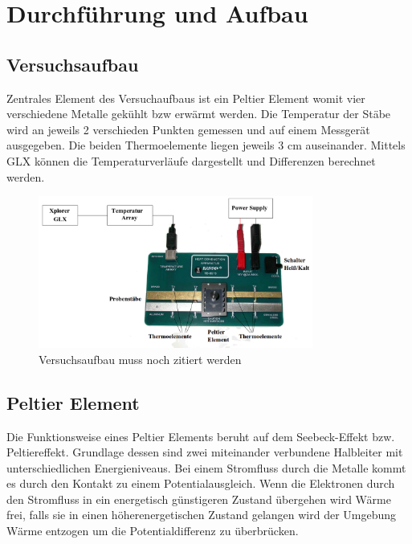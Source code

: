 \section{Durchführung und Aufbau}
\label{sec:Durchführung}
\subsection{Versuchsaufbau}
Zentrales Element des Versuchaufbaus ist ein Peltier Element womit vier verschiedene Metalle gekühlt bzw erwärmt werden. Die Temperatur der Stäbe wird an jeweils 2 verschieden Punkten gemessen und auf einem Messgerät ausgegeben. Die beiden Thermoelemente liegen jeweils 3 \si{\cm} auseinander. Mittels GLX können die Temperaturverläufe dargestellt und Differenzen berechnet werden.

\begin{figure}[ht]
	\centering
	\includegraphics[height=5cm]{./Aufbau.png}
	\caption{Versuchsaufbau muss noch zitiert werden \cite{Aufbau}
}
	\label{fig:Aufbau}
\end{figure}



\subsection{Peltier Element}
Die Funktionsweise eines Peltier Elements beruht auf dem Seebeck-Effekt bzw. Peltiereffekt. Grundlage dessen sind zwei miteinander verbundene Halbleiter mit unterschiedlichen Energieniveaus. Bei einem Stromfluss durch die Metalle kommt es durch den Kontakt zu einem Potentialausgleich. Wenn die Elektronen durch den Stromfluss in ein energetisch günstigeren Zustand übergehen wird Wärme frei, falls sie in einen höherenergetischen Zustand gelangen wird der Umgebung Wärme entzogen um die Potentialdifferenz zu überbrücken.


